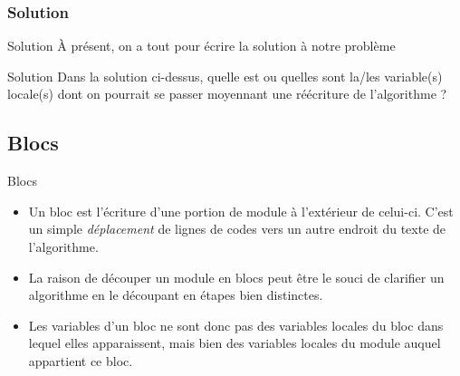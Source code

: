 \subsubsection{Solution}

\begin{frame}{Solution}
	À présent, on a tout pour écrire la solution à notre problème

	\bigskip
	
\end{frame}

\begin{frame}{Solution}
	Dans la solution ci-dessus, 
	quelle est ou quelles sont la/les variable(s) locale(s) 
	dont on pourrait se passer moyennant une réécriture de
	l'algorithme ?
\end{frame}

\subsection{Blocs}

\begin{frame}{Blocs}
	\begin{itemize}
	\item
	Un bloc est l’écriture d’une portion de module
	à l’extérieur de celui-ci. C’est un simple
	{\textit{déplacement}}
	de lignes de codes vers un autre endroit du texte de
	l'algorithme.
	
	\bigskip
	
	\item
	La raison de découper un module en blocs
	peut être le souci de clarifier un algorithme en le découpant en étapes
	bien distinctes.
	
	\bigskip
	
	\item
	Les variables
	d’un bloc ne sont donc pas des variables locales du bloc dans lequel
	elles apparaissent, mais bien des variables locales du module auquel
	appartient ce bloc.
	\end{itemize}
\end{frame}

